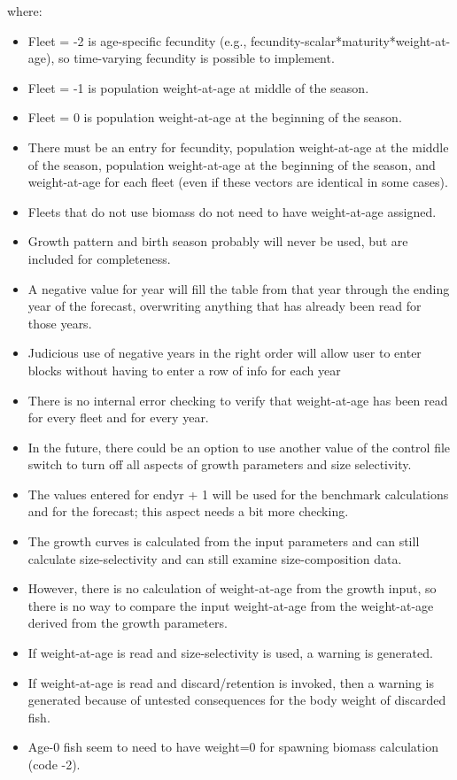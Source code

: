 where:

\begin{itemize}
	\item Fleet = -2 is age-specific fecundity (e.g., fecundity-scalar*maturity*weight-at-age), so time-varying fecundity is possible to implement.
	\item Fleet = -1 is population weight-at-age at middle of the season.
	\item Fleet = 0 is population weight-at-age at the beginning of the season.
	\item There must be an entry for fecundity, population weight-at-age at the middle of the season, population weight-at-age at the beginning of the season, and weight-at-age for each fleet (even if these vectors are identical in some cases).
	\item Fleets that do not use biomass do not need to have weight-at-age assigned.
	\item Growth pattern and birth season probably will never be used, but are included for completeness.
	\item A negative value for year will fill the table from that year through the ending year of the forecast, overwriting anything that has already been read for those years.
	\item Judicious use of negative years in the right order will allow user to enter blocks without having to enter a row of info for each year
	\item There is no internal error checking to  verify that weight-at-age has been read for every fleet and for every year.
	\item In the future, there could be an option to use another value of the control file switch to turn off all aspects of growth parameters and size selectivity.
	\item The values entered for endyr + 1 will be used for the benchmark calculations and for the forecast; this aspect needs a bit more checking.
\end{itemize}


		 \begin{itemize}
			\item The growth curves is calculated from the input parameters and can still calculate size-selectivity and can still examine size-composition data.
			\item However, there is no calculation of weight-at-age from the growth input, so there is no way to compare the input weight-at-age from the weight-at-age derived from the growth parameters.
			\item If weight-at-age is read and size-selectivity is used, a warning is generated.
			\item If weight-at-age is read and discard/retention is invoked, then a warning is generated because of untested consequences for the body weight of discarded fish.
			\item Age-0 fish seem to need to have weight=0 for spawning biomass calculation (code -2).
		\end{itemize}

